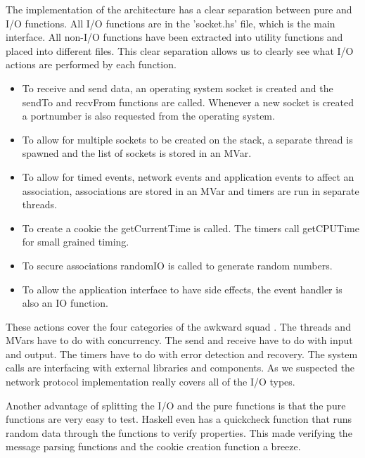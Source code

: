 The implementation of the architecture has a clear separation between pure and I/O functions. All I/O functions are in the 'socket.hs' file, which is the main interface. All non-I/O functions have been extracted into utility functions and placed into different files. This clear separation allows us to clearly see what I/O actions are performed by each function.

\begin{itemize}
\item To receive and send data, an operating system socket is created and the sendTo and recvFrom functions are called. Whenever a new socket is created a portnumber is also requested from the operating system.
\item To allow for multiple sockets to be created on the stack, a separate thread is spawned and the list of sockets is stored in an MVar.
\item To allow for timed events, network events and application events to affect an association, associations are stored in an MVar and timers are run in separate threads.
\item To create a cookie the getCurrentTime is called. The timers call getCPUTime for small grained timing.
\item To secure associations randomIO is called to generate random numbers.
\item To allow the application interface to have side effects, the event handler is also an IO function.
\end{itemize}

These actions cover the four categories of the awkward squad \cite{jones_tackling_2009}. The threads and MVars have to do with concurrency. The send and receive have to do with input and output. The timers have to do with error detection and recovery. The system calls are interfacing with external libraries and components. As we suspected the network protocol implementation really covers all of the I/O types.


Another advantage of splitting the I/O and the pure functions is that the pure functions are very easy to test. Haskell even has a quickcheck function that runs random data through the functions to verify properties. This made verifying the message parsing functions and the cookie creation function a breeze.

